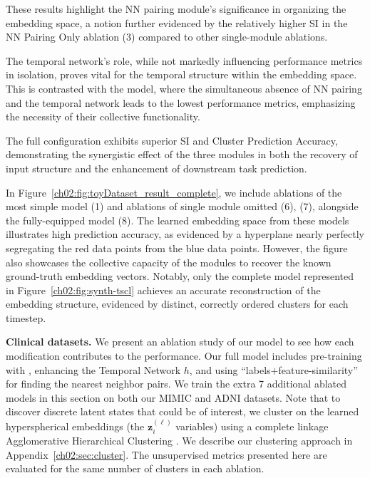 These results highlight the NN pairing module's significance in organizing the embedding space, a notion further evidenced by the relatively higher SI in the NN Pairing Only ablation (3) compared to other single-module ablations.

The temporal network's role, while not markedly influencing performance metrics in isolation, proves vital for the temporal structure within the embedding space.
This is contrasted with the  model, where the simultaneous absence of NN pairing and the temporal network leads to the lowest performance metrics, emphasizing the necessity of their collective functionality.

The full  configuration exhibits superior SI and Cluster Prediction Accuracy, demonstrating the synergistic effect of the three modules in both the recovery of input structure and the enhancement of downstream task prediction.

In Figure~\ref{ch02:fig:toyDataset_result_complete}, we include ablations of the most simple model (1) and ablations of single module omitted (6), (7), alongside the fully-equipped model (8).
The learned embedding space from these models illustrates high prediction accuracy, as evidenced by a hyperplane nearly perfectly segregating the red data points from the blue data points.
However, the figure also showcases the collective capacity of the modules to recover the known ground-truth embedding vectors.
Notably, only the complete model represented in Figure~\ref{ch02:fig:synth-tscl} achieves an accurate reconstruction of the embedding structure, evidenced by distinct, correctly ordered clusters for each timestep.


\noindent
\textbf{Clinical datasets.} We present an ablation study of our model to see how each modification contributes to the performance.
Our full model includes pre-training with , enhancing the Temporal Network $h$, and using ``labels$+$feature-similarity'' for finding the nearest neighbor pairs. 
We train the extra 7 additional ablated models in this section on both our MIMIC and ADNI datasets.
Note that to discover discrete latent states that could be of interest, we cluster on the learned hyperspherical embeddings (the $\mathbf{z}_i^{(\ell)}$ variables)  using a complete linkage Agglomerative Hierarchical Clustering \citep{murtagh2012algorithms}.
We describe our clustering approach in Appendix~\ref{ch02:sec:cluster}.
The unsupervised metrics presented here are evaluated for the same number of clusters in each ablation.


